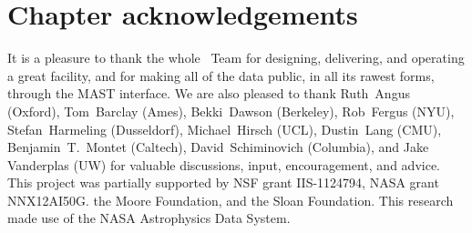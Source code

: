 \section{Chapter acknowledgements}

It is a pleasure to thank the whole \Kepler\ Team
  for designing, delivering, and operating a great facility,
  and for making all of the data public, in all its rawest forms, through the MAST interface.
We are also pleased to thank
  Ruth~Angus (Oxford),
  Tom~Barclay (Ames),
  Bekki~Dawson (Berkeley),
  Rob~Fergus (NYU),
  Stefan~Harmeling (Dusseldorf),
  Michael~Hirsch (UCL),
  Dustin~Lang (CMU),
  Benjamin~T.~Montet (Caltech),
  David~Schiminovich (Columbia),
  and
  Jake Vanderplas (UW)
for valuable discussions, input, encouragement, and advice.
This project was partially supported by
  NSF grant IIS-1124794,
  NASA grant NNX12AI50G.
  the Moore Foundation,
  and
  the Sloan Foundation.
This research made use of the NASA Astrophysics Data System.
